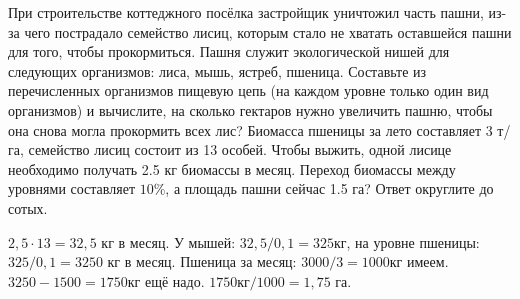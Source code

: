 
При
строительстве коттеджного посёлка застройщик уничтожил часть пашни, из-за чего
пострадало семейство лисиц, которым стало не хватать оставшейся пашни для того,
чтобы прокормиться. Пашня служит экологической нишей для следующих организмов:
лиса, мышь, ястреб, пшеница. Составьте из перечисленных организмов пищевую цепь (на каждом уровне только один вид организмов) и вычислите, на сколько гектаров нужно увеличить пашню, чтобы она снова могла
прокормить всех лис? Биомасса пшеницы за лето составляет 3 т/га, семейство лисиц
состоит из 13  особей. Чтобы выжить, одной лисице необходимо получать 2.5 кг
биомассы в месяц. Переход биомассы между уровнями составляет $10\%$, а площадь
пашни сейчас 1.5 га? Ответ округлите до сотых.

\solutionSection

$2,5 \cdot 13=32,5$ кг в месяц. У мышей: $32,5/0,1 = 325$кг, на уровне пшеницы: $325/0,1 = 3250$ кг в месяц. 
Пшеница за месяц: $3000/3=1000$кг имеем.\\ $3250-1500 = 1750$кг ещё надо. $1750кг/1000=1,75$ га.

